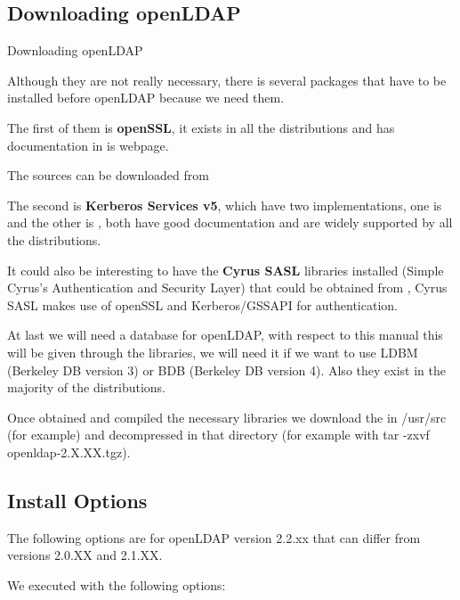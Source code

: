 \subsection{Downloading openLDAP}
\label{down_ldap}
Downloading openLDAP 

Although they are not really necessary, there is several packages that have to be installed before openLDAP because we need them.

The first of them is \textbf{openSSL}, it exists in all the distributions and has documentation in is webpage\cite{ssldoc}. 

The sources can be downloaded from 

The second is \textbf{Kerberos Services v5}, which have two implementations, one is  and the other is , both have good documentation and are widely supported by all the distributions. 

It could also be interesting to have the \textbf{Cyrus SASL} libraries installed (Simple Cyrus's Authentication and Security Layer) that could be obtained from , Cyrus SASL makes use of openSSL and Kerberos/GSSAPI for authentication. 

At last we will need a database for openLDAP, with respect to this manual this will be given through the  libraries, we will need it if we want to use LDBM (Berkeley DB version 3) or BDB (Berkeley DB version 4). Also they exist in the majority of the distributions. 

Once obtained and compiled the necessary libraries we download the  in /usr/src (for example) and decompressed in that directory (for example with tar -zxvf openldap-2.X.XX.tgz).
\newpage
\subsection{Install Options}

The following options are for openLDAP version 2.2.xx that can differ from versions 2.0.XX and 2.1.XX. 

We executed  with the following options:

